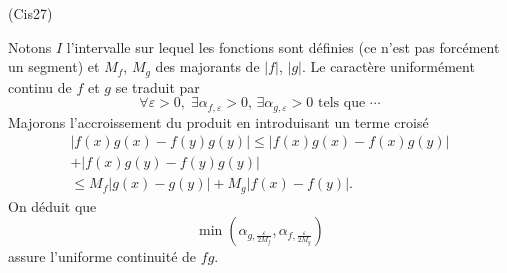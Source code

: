 \begin{tiny}(Cis27)\end{tiny} Notons $I$ l'intervalle sur lequel les fonctions sont définies (ce n'est pas forcément un segment) et $M_f$, $M_g$ des majorants de $|f|$, $|g|$. Le caractère uniformément continu de $f$ et $g$ se traduit par
\[
  \forall \varepsilon >0, \; \exists \alpha_{f, \varepsilon}>0, \, \exists \alpha_{g,\varepsilon}> 0 \text{ tels que } \cdots 
\]
Majorons l'accroissement du produit en introduisant un terme croisé
\begin{multline*}
\left|f(x)g(x) - f(y)g(y)\right| \leq \left|f(x)g(x) - f(x)g(y)\right| \\
+ \left|f(x)g(y) - f(y)g(y)\right| \\
 \leq M_f \left|g(x) - g(y)\right| + M_g \left|f(x) - f(y)\right| .
\end{multline*}
On déduit que
\[
 \min(\alpha_{g,\frac{\varepsilon}{2M_f}}, \alpha_{f,\frac{\varepsilon}{2M_g}})
\]
assure l'uniforme continuité de $fg$.
 

